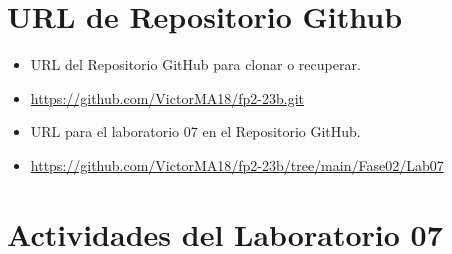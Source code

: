 \documentclass{article}
\begin{document}
	\section{URL de Repositorio Github}
	\begin{itemize}
		\item URL del Repositorio GitHub para clonar o recuperar.
		\item \url{https://github.com/VictorMA18/fp2-23b.git}
		\item URL para el laboratorio 07 en el Repositorio GitHub.
		\item \url{https://github.com/VictorMA18/fp2-23b/tree/main/Fase02/Lab07}
	\end{itemize}
	
	\section{Actividades del Laboratorio 07}
	
\end{document}
